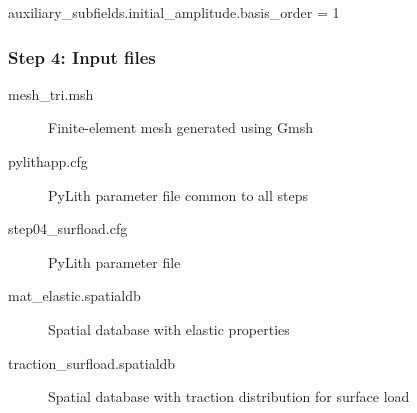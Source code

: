 \documentclass[aspectratio=169]{beamer}
\begin{document}
\begin{frame}[t,fragile]
\begin{minipage}[t]{0.67\textwidth}
\begin{onlyenv}
\begin{cfgcode}
        auxiliary_subfields.initial_amplitude.basis_order = 1
      \end{cfgcode}
    \end{onlyenv}
  \end{minipage}

  
\end{frame}


\begin{frame}
  \frametitle{Step 4: Input files}
  \summary{}

  \begin{description}
  \item[mesh\_tri.msh] Finite-element mesh generated using Gmsh
  \item[pylithapp.cfg] PyLith parameter file common to all steps
  \item[step04\_surfload.cfg] PyLith parameter file
  \item[mat\_elastic.spatialdb] Spatial database with elastic properties
  \item[traction\_surfload.spatialdb] Spatial database with traction distribution for surface load
  \end{description}

\end{frame}
\end{document}
